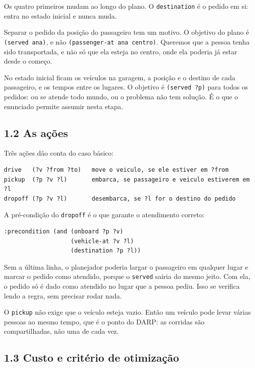 \documentclass[11pt,a4paper]{article}
\newcommand{\cod}[1]{\texttt{#1}}
\begin{document}
Os quatro primeiros mudam ao longo do plano. O \cod{destination} é o pedido em si: entra no estado inicial e nunca muda.

Separar o pedido da posição do passageiro tem um motivo. O objetivo do plano é \cod{(served ana)}, e não \cod{(passenger-at ana centro)}. Queremos que a pessoa tenha sido transportada, e não só que ela esteja no centro, onde ela poderia já estar desde o começo.

No estado inicial ficam os veículos na garagem, a posição e o destino de cada passageiro, e os tempos entre os lugares. O objetivo é \cod{(served ?p)} para todos os pedidos: ou se atende todo mundo, ou o problema não tem solução. É o que o enunciado permite assumir nesta etapa.

\subsection*{1.2 As ações}

Três ações dão conta do caso básico:

\begin{lstlisting}
drive   (?v ?from ?to)   move o veiculo, se ele estiver em ?from
pickup  (?p ?v ?l)       embarca, se passageiro e veiculo estiverem em ?l
dropoff (?p ?v ?l)       desembarca, se ?l for o destino do pedido
\end{lstlisting}

A pré-condição do \cod{dropoff} é o que garante o atendimento correto:

\begin{lstlisting}
:precondition (and (onboard ?p ?v)
                   (vehicle-at ?v ?l)
                   (destination ?p ?l))
\end{lstlisting}

Sem a última linha, o planejador poderia largar o passageiro em qualquer lugar e marcar o pedido como atendido, porque o \cod{served} sairia do mesmo jeito. Com ela, o pedido só é dado como atendido no lugar que a pessoa pediu. Isso se verifica lendo a regra, sem precisar rodar nada.

O \cod{pickup} não exige que o veículo esteja vazio. Então um veículo pode levar várias pessoas ao mesmo tempo, que é o ponto do DARP: as corridas são compartilhadas, não uma de cada vez.

\subsection*{1.3 Custo e critério de otimização}
\end{document}
